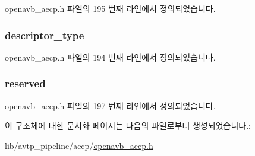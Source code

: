 openavb\+\_\+aecp.\+h 파일의 195 번째 라인에서 정의되었습니다.

\subsubsection[{\texorpdfstring{descriptor\+\_\+type}{descriptor_type}}]{ descriptor\+\_\+type}\hypertarget{structopenavb__aecp__commandresponse__data__set__clock__source__t_a1e231d7874aada5925b29affc76782cc}{}\label{structopenavb__aecp__commandresponse__data__set__clock__source__t_a1e231d7874aada5925b29affc76782cc}


openavb\+\_\+aecp.\+h 파일의 194 번째 라인에서 정의되었습니다.

\subsubsection[{\texorpdfstring{reserved}{reserved}}]{ reserved}\hypertarget{structopenavb__aecp__commandresponse__data__set__clock__source__t_ac15a687d635cc969d1bfab4d96858b77}{}\label{structopenavb__aecp__commandresponse__data__set__clock__source__t_ac15a687d635cc969d1bfab4d96858b77}


openavb\+\_\+aecp.\+h 파일의 197 번째 라인에서 정의되었습니다.



이 구조체에 대한 문서화 페이지는 다음의 파일로부터 생성되었습니다.\+:\begin{DoxyCompactItemize}
\item 
lib/avtp\+\_\+pipeline/aecp/\hyperlink{openavb__aecp_8h}{openavb\+\_\+aecp.\+h}\end{DoxyCompactItemize}
